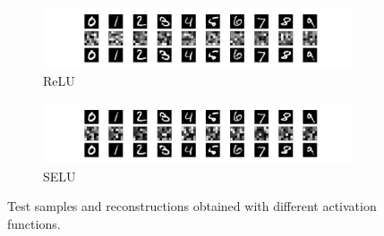 \begin{figure}[htbp]
  \begin{subfigure}{0.48\figwidth}
    \includegraphics[width=\textwidth,trim={14em 2em 12em 16em},clip]{basic-36-relu-rmsprop-xent.pdf}
    \caption{\label{Fig.act.relu}ReLU}
  \end{subfigure}
  \begin{subfigure}{0.48\figwidth}
    \includegraphics[width=\textwidth,trim={14em 2em 12em 16em},clip]{basic-36-selu-rmsprop-xent.pdf}
    \caption{\label{Fig.act.selu}SELU}
  \end{subfigure}
  \caption{\label{Fig.activations}Test samples and reconstructions obtained with different activation functions.}
\end{figure}

